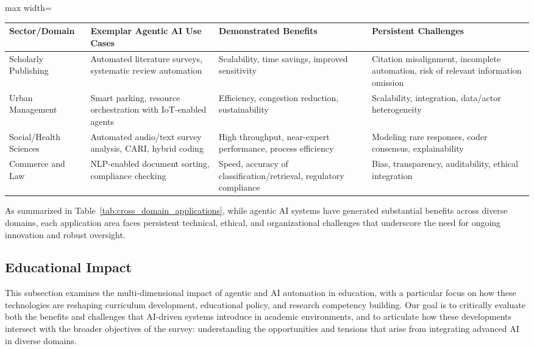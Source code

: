 \documentclass[sigconf]{acmart}
\begin{document}
\begin{table*}[htbp]
\centering
\caption{Representative Cross-Sector Agentic AI Applications and Key Challenges}
\label{tab:cross_domain_applications}
\begin{adjustbox}{max width=\textwidth}
\begin{tabular}{@{}llll@{}}
\toprule
\textbf{Sector/Domain} & \textbf{Exemplar Agentic AI Use Cases} & \textbf{Demonstrated Benefits} & \textbf{Persistent Challenges} \\
\midrule
Scholarly Publishing & Automated literature surveys, systematic review automation & Scalability, time savings, improved sensitivity & Citation misalignment, incomplete automation, risk of relevant information omission \\
Urban Management & Smart parking, resource orchestration with IoT-enabled agents & Efficiency, congestion reduction, sustainability & Scalability, integration, data/actor heterogeneity \\
Social/Health Sciences & Automated audio/text survey analysis, CARI, hybrid coding & High throughput, near-expert performance, process efficiency & Modeling rare responses, coder consensus, explainability \\
Commerce and Law & NLP-enabled document sorting, compliance checking & Speed, accuracy of classification/retrieval, regulatory compliance & Bias, transparency, auditability, ethical integration \\
\bottomrule
\end{tabular}
\end{adjustbox}
\end{table*}

As summarized in Table~\ref{tab:cross_domain_applications}, while agentic AI systems have generated substantial benefits across diverse domains, each application area faces persistent technical, ethical, and organizational challenges that underscore the need for ongoing innovation and robust oversight.

\subsection{Educational Impact}

This subsection examines the multi-dimensional impact of agentic and AI automation in education, with a particular focus on how these technologies are reshaping curriculum development, educational policy, and research competency building. Our goal is to critically evaluate both the benefits and challenges that AI-driven systems introduce in academic environments, and to articulate how these developments intersect with the broader objectives of the survey: understanding the opportunities and tensions that arise from integrating advanced AI in diverse domains.
\end{document}
